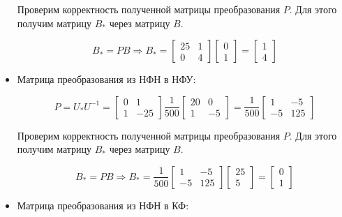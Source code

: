 \documentclass[14pt,a4paper,report]{report}
\begin{document}
\begin{itemize}
	Проверим корректность полученной матрицы преобразования $P$. Для этого получим матрицу $B_{*}$ через матрицу $B$. 
	
	\begin{equation*}
	\text{$B_{*}=PB$}
	\Longrightarrow
	\text{$B_{*}=\begin{bmatrix} 25 & 1 \\ 0 & 4 \end{bmatrix}\begin{bmatrix} 0 \\ 1 \end{bmatrix}=\begin{bmatrix} 1 \\ 4 \end{bmatrix}$}
	\end{equation*}
	
	\item Матрица преобразования из НФН в НФУ:
	
	\begin{equation*}
	\text{$P=U_{*}U^{-1}=\begin{bmatrix} 0 & 1 \\ 1 & -25 \end{bmatrix}\frac{1}{500}\begin{bmatrix} 20 & 0 \\ 1 & -5 \end{bmatrix}=\frac{1}{500}\begin{bmatrix} 1 & -5 \\ -5 & 125 \end{bmatrix}$}
	\end{equation*}
	
	Проверим корректность полученной матрицы преобразования $P$. Для этого получим матрицу $B_{*}$ через матрицу $B$.
	
	\begin{equation*}
	\text{$B_{*}=PB$}
	\Longrightarrow
	\text{$B_{*}=\frac{1}{500}\begin{bmatrix} 1 & -5 \\ -5 & 125 \end{bmatrix}\begin{bmatrix} 25 \\ 5 \end{bmatrix}=\begin{bmatrix} 0 \\ 1 \end{bmatrix}$}
	\end{equation*}
	
	\item Матрица преобразования из НФН в КФ:
	

\end{itemize}
\end{document}
